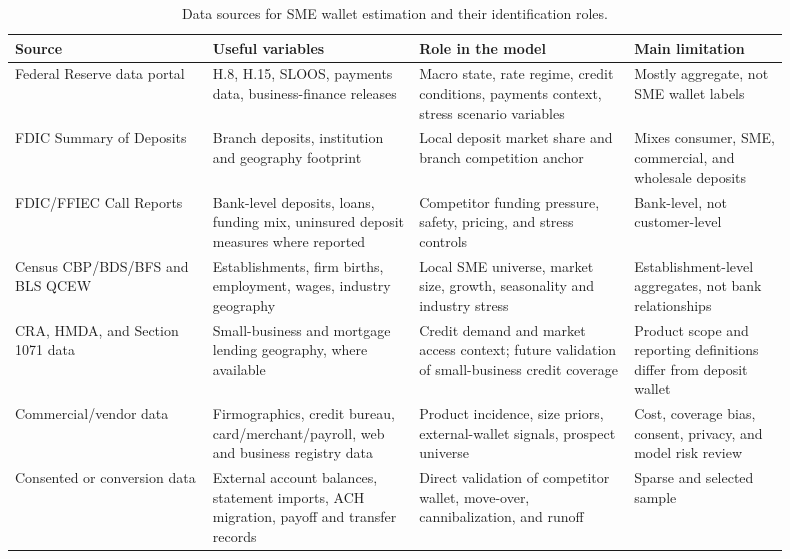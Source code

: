\documentclass[11pt]{article}
\begin{document}
\begin{table}[htbp]
\centering
\footnotesize
\begin{tabular}{@{}
  >{\raggedright\arraybackslash}p{0.23\linewidth}
  >{\raggedright\arraybackslash}p{0.24\linewidth}
  >{\raggedright\arraybackslash}p{0.25\linewidth}
  >{\raggedright\arraybackslash}p{0.18\linewidth}
@{}}
\toprule
Source & Useful variables & Role in the model & Main limitation \\
\midrule
Federal Reserve data portal & H.8, H.15, SLOOS, payments data, business-finance
releases & Macro state, rate regime, credit conditions, payments context, stress
scenario variables & Mostly aggregate, not SME wallet labels \\
FDIC Summary of Deposits & Branch deposits, institution and geography footprint
& Local deposit market share and branch competition anchor & Mixes consumer,
SME, commercial, and wholesale deposits \\
FDIC/FFIEC Call Reports & Bank-level deposits, loans, funding mix, uninsured
deposit measures where reported & Competitor funding pressure, safety, pricing,
and stress controls & Bank-level, not customer-level \\
Census CBP/BDS/BFS and BLS QCEW & Establishments, firm births, employment,
wages, industry geography & Local SME universe, market size, growth, seasonality
and industry stress & Establishment-level aggregates, not bank relationships \\
CRA, HMDA, and Section 1071 data & Small-business and mortgage lending
geography, where available & Credit demand and market access context; future
validation of small-business credit coverage
\citep{ffiec2026cra,cfpb2026hmda,cfpb2023section1071} & Product scope and
reporting definitions differ from deposit wallet \\
Commercial/vendor data & Firmographics, credit bureau, card/merchant/payroll,
web and business registry data & Product incidence, size priors, external-wallet
signals, prospect universe & Cost, coverage bias, consent, privacy, and model
risk review \\
Consented or conversion data & External account balances, statement imports,
ACH migration, payoff and transfer records & Direct validation of competitor
wallet, move-over, cannibalization, and runoff & Sparse and selected sample \\
\bottomrule
\end{tabular}
\caption{Data sources for SME wallet estimation and their identification roles.}
\label{tab:data_sources}
\end{table}
\end{document}
